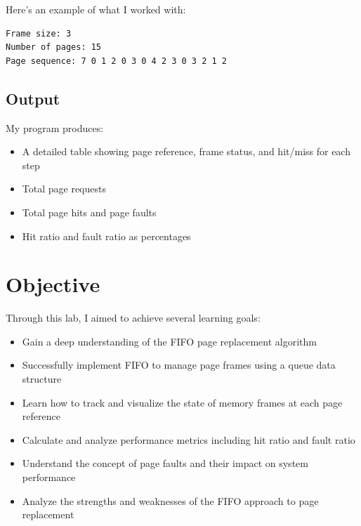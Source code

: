 \documentclass[12pt,a4paper]{article}
\begin{document}
Here's an example of what I worked with:
\begin{verbatim}
Frame size: 3
Number of pages: 15
Page sequence: 7 0 1 2 0 3 0 4 2 3 0 3 2 1 2
\end{verbatim}

\subsection*{Output}
My program produces:
\begin{itemize}
  \item A detailed table showing page reference, frame status, and hit/miss for each step
  \item Total page requests
  \item Total page hits and page faults
  \item Hit ratio and fault ratio as percentages
\end{itemize}

\section{Objective}
Through this lab, I aimed to achieve several learning goals:
\begin{itemize}
    \item Gain a deep understanding of the FIFO page replacement algorithm
    \item Successfully implement FIFO to manage page frames using a queue data structure
    \item Learn how to track and visualize the state of memory frames at each page reference
    \item Calculate and analyze performance metrics including hit ratio and fault ratio
    \item Understand the concept of page faults and their impact on system performance
    \item Analyze the strengths and weaknesses of the FIFO approach to page replacement
\end{itemize}
\end{document}
